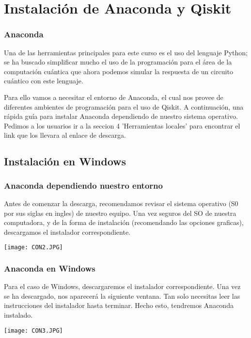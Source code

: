 \documentclass[spanish]{beamer}
\begin{document}

\newpage\section{Instalación de Anaconda y Qiskit}
\begin{frame}\frametitle{Anaconda}
\setlength{\parskip}{5mm}\justify
Una de las herramientas principales para este curso es el uso del lenguaje Python; se ha buscado simplificar mucho el uso de la programación para el área de la computación cuántica que ahora podemos simular la respuesta de un circuito cuántico con este lenguaje.

Para ello vamos a necesitar el entorno de Anaconda, el cual nos provee de diferentes ambientes de programación para el uso de Qiskit. A continuación, una rápida guía para instalar Anaconda dependiendo de nuestro sistema operativo. Pedimos a los usuarios ir a la seccion 4 'Herramientas locales' para encontrar el link que los llevara al enlace de descarga.
\end{frame}
\newpage\subsection{Instalación en Windows}
\begin{frame}\frametitle{Anaconda dependiendo nuestro entorno}
\setlength{\parskip}{5mm}\justify
Antes de comenzar la descarga, recomendamos revisar el sistema operativo (S0 por sus siglas en ingles) de nuestro equipo. Una vez seguros del SO de nuestra computadora, y de la forma de instalación (recomendando las opciones graficas), descargamos el instalador correspondiente.

\centering\texttt{[image: CON2.JPG]}

\end{frame}
\newpage
\begin{frame}\frametitle{Anaconda en Windows}
\setlength{\parskip}{5mm}\justify
Para el caso de Windows, descargaremos el instalador correspondiente. Una vez se ha descargado, nos aparecerá la siguiente ventana. Tan solo necesitas leer las instrucciones del instalador hasta terminar. Hecho esto, tendremos Anaconda instalado.

\centering\texttt{[image: CON3.JPG]}

\end{frame}
\end{document}
